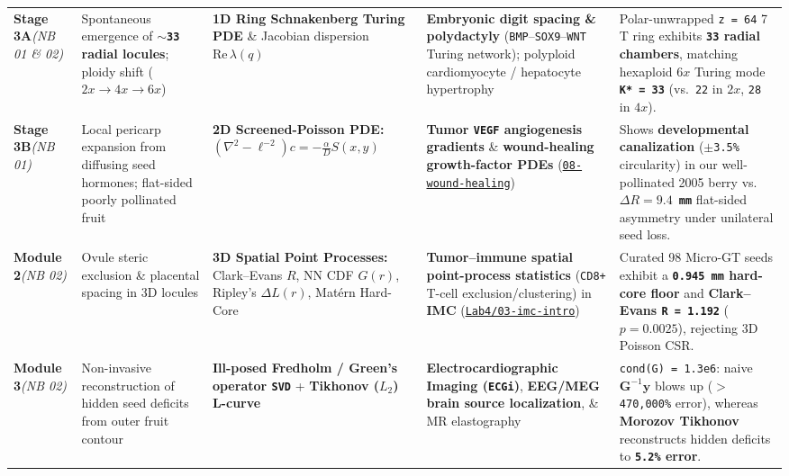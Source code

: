 \documentclass[10pt,a4paper]{article}
\newcommand{\ghblob}{https://github.com/arvidl/BMED365-2027/blob/main}
\begin{document}
{\begin{xltabular}{\textwidth}{L{1.85cm} L{3.3cm} L{3.55cm} L{3.7cm} Y}
\textbf{Stage 3A}\newline \textit{(NB 01 \& 02)} &
Spontaneous emergence of \textbf{\texttt{$\sim$33} radial locules}; ploidy shift ($2x \to 4x \to 6x$) &
\textbf{1D Ring Schnakenberg Turing PDE} \& Jacobian dispersion $\text{Re}\,\lambda(q)$ &
\textbf{Embryonic digit spacing \& polydactyly} (\texttt{BMP}--\texttt{SOX9}--\texttt{WNT} Turing network); polyploid cardiomyocyte / hepatocyte hypertrophy &
Polar-unwrapped \texttt{z = 64} 7\,T ring exhibits \textbf{\texttt{33} radial chambers}, matching hexaploid $6x$ Turing mode \textbf{\texttt{K* = 33}} (vs.\ \texttt{22} in $2x$, \texttt{28} in $4x$). \\

\textbf{Stage 3B}\newline \textit{(NB 01)} &
Local pericarp expansion from diffusing seed hormones; flat-sided poorly pollinated fruit &
\textbf{2D Screened-Poisson PDE:} $(\nabla^2 - \ell^{-2})c = -\frac{\alpha}{D}S(x,y)$ &
\textbf{Tumor \texttt{VEGF} angiogenesis gradients} \& \textbf{wound-healing growth-factor PDEs} (\href{\ghblob/Lab5-Comp-Mod/notebooks/08-cybernetics-of-wound-healing.ipynb}{\texttt{08-wound-healing}}) &
Shows \textbf{developmental canalization} (\texttt{$\pm$3.5\%} circularity) in our well-pollinated 2005 berry vs.\ \textbf{\texttt{$\Delta R = 9.4$\,mm}} flat-sided asymmetry under unilateral seed loss. \\

\textbf{Module 2}\newline \textit{(NB 02)} &
Ovule steric exclusion \& placental spacing in 3D locules &
\textbf{3D Spatial Point Processes:} Clark--Evans $R$, NN CDF $G(r)$, Ripley's $\Delta L(r)$, Mat\'ern Hard-Core &
\textbf{Tumor--immune spatial point-process statistics} (\texttt{CD8+} T-cell exclusion/clustering) in \textbf{IMC} (\href{\ghblob/Lab4-Comp-Imag/03-imc-intro.ipynb}{\texttt{Lab4/03-imc-intro}}) &
Curated 98 Micro-GT seeds exhibit a \textbf{\texttt{0.945\,mm} hard-core floor} and \textbf{Clark--Evans \texttt{R = 1.192}} ($p = 0.0025$), rejecting 3D Poisson CSR. \\

\textbf{Module 3}\newline \textit{(NB 02)} &
Non-invasive reconstruction of hidden seed deficits from outer fruit contour &
\textbf{Ill-posed Fredholm / Green's operator \texttt{SVD}} + \textbf{Tikhonov ($L_2$) L-curve} &
\textbf{Electrocardiographic Imaging (\texttt{ECGi})}, \textbf{EEG/MEG brain source localization}, \& MR elastography &
\texttt{cond(G) = 1.3e6}: naive $\mathbf{G}^{-1}\mathbf{y}$ blows up (\texttt{$>$470,000\%} error), whereas \textbf{Morozov Tikhonov} reconstructs hidden deficits to \textbf{\texttt{5.2\%} error}. \\


\end{xltabular}}
\end{document}
